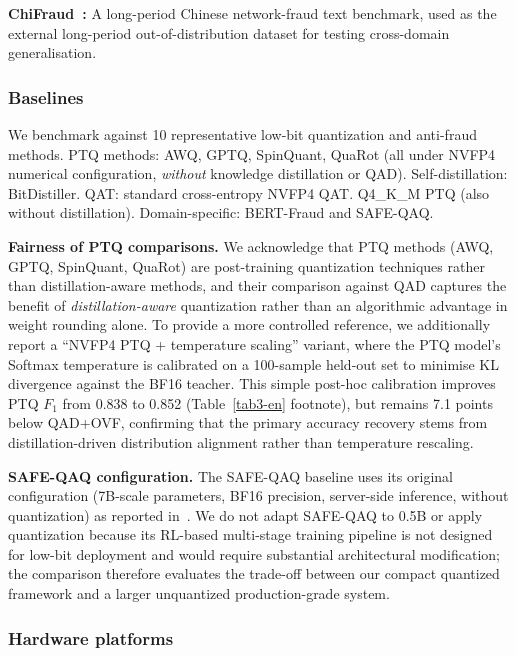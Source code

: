 \documentclass[11pt, a4paper]{article}
\begin{document}
\textbf{ChiFraud~\cite{chifraud}:} A long-period Chinese network-fraud text benchmark, used as the external long-period out-of-distribution dataset for testing cross-domain generalisation.

\subsubsection{Baselines}

We benchmark against 10 representative low-bit quantization and anti-fraud methods. PTQ methods: AWQ, GPTQ, SpinQuant, QuaRot (all under NVFP4 numerical configuration, \emph{without} knowledge distillation or QAD). Self-distillation: BitDistiller. QAT: standard cross-entropy NVFP4 QAT. Q4\_K\_M PTQ (also without distillation). Domain-specific: BERT-Fraud and SAFE-QAQ.

\medskip
\noindent\textbf{Fairness of PTQ comparisons.} We acknowledge that PTQ methods (AWQ, GPTQ, SpinQuant, QuaRot) are post-training quantization techniques rather than distillation-aware methods, and their comparison against QAD captures the benefit of \emph{distillation-aware} quantization rather than an algorithmic advantage in weight rounding alone. To provide a more controlled reference, we additionally report a ``NVFP4 PTQ + temperature scaling'' variant, where the PTQ model's Softmax temperature is calibrated on a 100-sample held-out set to minimise KL divergence against the BF16 teacher. This simple post-hoc calibration improves PTQ $F_1$ from 0.838 to 0.852 (Table~\ref{tab3-en} footnote), but remains 7.1 points below QAD+OVF, confirming that the primary accuracy recovery stems from distillation-driven distribution alignment rather than temperature rescaling.

\medskip
\noindent\textbf{SAFE-QAQ configuration.} The SAFE-QAQ baseline uses its original configuration (7B-scale parameters, BF16 precision, server-side inference, without quantization) as reported in~\cite{2}. We do not adapt SAFE-QAQ to 0.5B or apply quantization because its RL-based multi-stage training pipeline is not designed for low-bit deployment and would require substantial architectural modification; the comparison therefore evaluates the trade-off between our compact quantized framework and a larger unquantized production-grade system.

\subsubsection{Hardware platforms}
\end{document}
